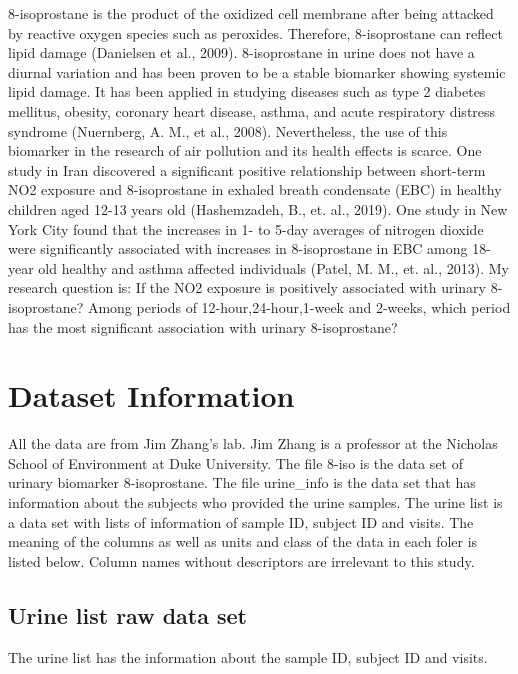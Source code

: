 \documentclass[12pt,]{article}
\begin{document}
8-isoprostane is the product of the oxidized cell membrane after being
attacked by reactive oxygen species such as peroxides. Therefore,
8-isoprostane can reflect lipid damage (Danielsen et al., 2009).
8-isoprostane in urine does not have a diurnal variation and has been
proven to be a stable biomarker showing systemic lipid damage. It has
been applied in studying diseases such as type 2 diabetes mellitus,
obesity, coronary heart disease, asthma, and acute respiratory distress
syndrome (Nuernberg, A. M., et al., 2008). Nevertheless, the use of this
biomarker in the research of air pollution and its health effects is
scarce. One study in Iran discovered a significant positive relationship
between short-term NO2 exposure and 8-isoprostane in exhaled breath
condensate (EBC) in healthy children aged 12-13 years old (Hashemzadeh,
B., et. al., 2019). One study in New York City found that the increases
in 1- to 5-day averages of nitrogen dioxide were significantly
associated with increases in 8-isoprostane in EBC among 18-year old
healthy and asthma affected individuals (Patel, M. M., et. al., 2013).
My research question is: If the NO2 exposure is positively associated
with urinary 8-isoprostane? Among periods of 12-hour,24-hour,1-week and
2-weeks, which period has the most significant association with urinary
8-isoprostane?

\hypertarget{dataset-information}{%
\section{Dataset Information}\label{dataset-information}}

All the data are from Jim Zhang's lab. Jim Zhang is a professor at the
Nicholas School of Environment at Duke University. The file 8-iso is the
data set of urinary biomarker 8-isoprostane. The file urine\_info is the
data set that has information about the subjects who provided the urine
samples. The urine list is a data set with lists of information of
sample ID, subject ID and visits. The meaning of the columns as well as
units and class of the data in each foler is listed below. Column names
without descriptors are irrelevant to this study.

\hypertarget{urine-list-raw-data-set}{%
\subsection{Urine list raw data set}\label{urine-list-raw-data-set}}

The urine list has the information about the sample ID, subject ID and
visits.
\end{document}
